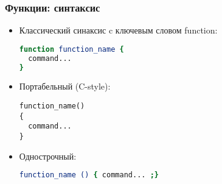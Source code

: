 \begin{frame}[fragile]
	\frametitle{Функции: синтаксис}
	\begin{itemize}
		\item Классический синаксис c ключевым словом \alert{function}: 
                        \begin{lstlisting}[language=bash,frame=single]
function function_name {
  command...
}
\end{lstlisting}
		\item Портабельный (C-style):
			\begin{lstlisting}
function_name()
{
  command...
} 
\end{lstlisting}

		\item Однострочный:
                        \begin{lstlisting}[language=bash,frame=single]
function_name () { command... ;}
\end{lstlisting}
  \end{itemize}
\end{frame}
